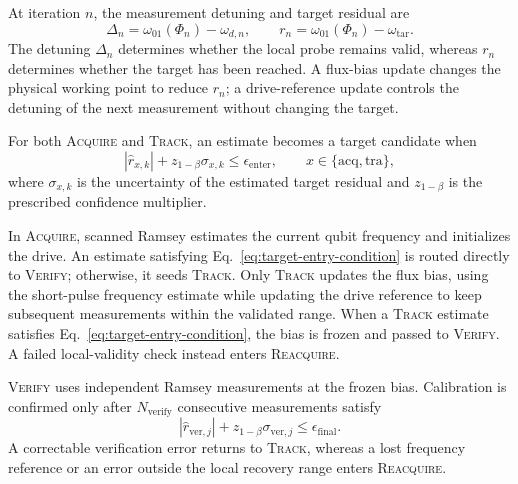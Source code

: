 At iteration $n$, the measurement detuning and target residual are
%
\begin{equation}
\Delta_n=\omega_{01}(\Phi_n)-\omega_{d,n},
\qquad
r_n=\omega_{01}(\Phi_n)-\omega_{\mathrm{tar}}.
\label{eq:detuning-and-residual}
\end{equation}
%
The detuning $\Delta_n$ determines whether the local probe remains valid,
whereas $r_n$ determines whether the target has been reached. A flux-bias
update changes the physical working point to reduce $r_n$; a drive-reference
update controls the detuning of the next measurement without changing the
target.

For both \textsc{Acquire} and \textsc{Track}, an estimate becomes a target
candidate when
%
\begin{equation}
|\widehat r_{x,k}|
+z_{1-\beta}\sigma_{x,k}
\leq\epsilon_{\mathrm{enter}},
\qquad
x\in\{\mathrm{acq},\mathrm{tra}\},
\label{eq:target-entry-condition}
\end{equation}
%
where $\sigma_{x,k}$ is the uncertainty of the estimated target residual and
$z_{1-\beta}$ is the prescribed confidence multiplier.

In \textsc{Acquire}, scanned Ramsey estimates the current qubit frequency and
initializes the drive. An estimate satisfying
Eq.~\eqref{eq:target-entry-condition} is routed directly to
\textsc{Verify}; otherwise, it seeds \textsc{Track}. Only \textsc{Track}
updates the flux bias, using the short-pulse frequency estimate while updating
the drive reference to keep subsequent measurements within the validated
range. When a \textsc{Track} estimate satisfies
Eq.~\eqref{eq:target-entry-condition}, the bias is frozen and passed to
\textsc{Verify}. A failed local-validity check instead enters
\textsc{Reacquire}.

\textsc{Verify} uses independent Ramsey measurements at the frozen bias.
Calibration is confirmed only after $N_{\mathrm{verify}}$ consecutive
measurements satisfy
%
\begin{equation}
|\widehat r_{\mathrm{ver},j}|
+z_{1-\beta}\sigma_{\mathrm{ver},j}
\leq\epsilon_{\mathrm{final}}.
\label{eq:verification-condition}
\end{equation}
%
A correctable verification error returns to \textsc{Track}, whereas a lost
frequency reference or an error outside the local recovery range enters
\textsc{Reacquire}.

